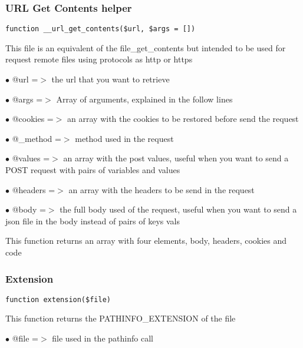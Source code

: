 \documentclass[a4paper]{article}
\begin{document}
\hypertarget{toc133}{}
\subsubsection{URL Get Contents helper}

\begin{lstlisting}
function __url_get_contents($url, $args = [])
\end{lstlisting}

This file is an equivalent of the file\_get\_contents but intended to be used
for request remote files using protocols as http or https

\begin{compactitem}
\item[\color{myblue}$\bullet$] @url     =$>$ the url that you want to retrieve
\item[\color{myblue}$\bullet$] @args    =$>$ Array of arguments, explained in the follow lines
\item[\color{myblue}$\bullet$] @cookies =$>$ an array with the cookies to be restored before send the request
\item[\color{myblue}$\bullet$] @\_method =$>$ method used in the request
\item[\color{myblue}$\bullet$] @values  =$>$ an array with the post values, useful when you want to send a POST
            request with pairs of variables and values
\item[\color{myblue}$\bullet$] @headers =$>$ an array with the headers to be send in the request
\item[\color{myblue}$\bullet$] @body    =$>$ the full body used of the request, useful when you want to send a
            json file in the body instead of pairs of keys vals
\end{compactitem}

This function returns an array with four elements, body, headers, cookies and code

\hypertarget{toc134}{}
\subsubsection{Extension}

\begin{lstlisting}
function extension($file)
\end{lstlisting}

This function returns the PATHINFO\_EXTENSION of the file

\begin{compactitem}
\item[\color{myblue}$\bullet$] @file =$>$ file used in the pathinfo call
\end{compactitem}
\end{document}
